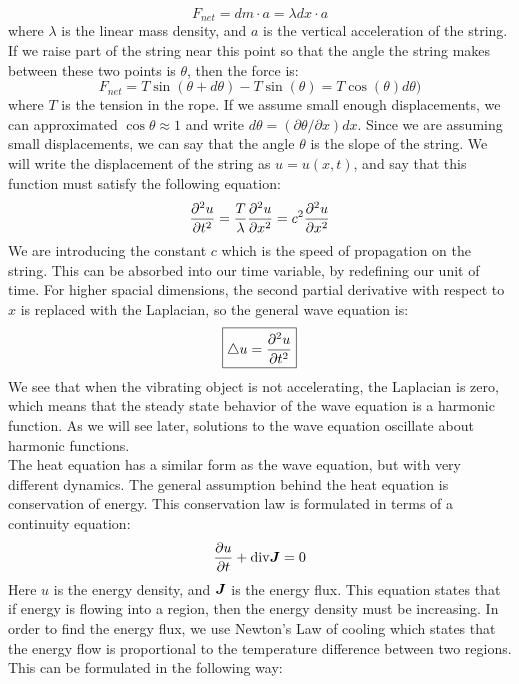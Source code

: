 \documentclass{article}
\begin{document}
\begin{equation}
    F_{net}=dm\cdot a=\lambda dx \cdot a
\end{equation}
where $\lambda$ is the linear mass density, and $a$ is the vertical acceleration of the string. If we raise part of the string near this point so that the angle the string makes between these two points is $\theta$, then the force is:
\begin{equation}
    F_{net}=T \sin(\theta + d\theta)-T \sin(\theta)=T\cos(\theta)d\theta)
\end{equation}
where $T$ is the tension in the rope. If we assume small enough displacements, we can approximated $\cos\theta\approx 1$ and write $d\theta= (\partial\theta/\partial x) dx$. Since we are assuming small displacements, we can say that the angle $\theta$ is the slope of the string. We will write the displacement of the string as $u=u(x,t)$, and say that this function must satisfy the following equation:
\begin{equation}\frac{\partial ^2 u}{\partial t^2}= \frac{T}{\lambda}\frac{\partial ^2 u}{\partial x^2}=c^2 \frac{\partial ^2 u}{\partial x^2}\end{equation}
We are introducing the constant $c$ which is the speed of propagation on the string. This can be absorbed into our time variable, by redefining our unit of time. For higher spacial dimensions, the second partial derivative with respect to $x$ is replaced with the Laplacian, so the general wave equation is:
\begin{equation}
  \boxed{
    \bigtriangleup u =\frac{\partial ^2 u}{\partial t^2}
  }
\end{equation}
We see that when the vibrating object is not accelerating, the Laplacian is zero, which means that the steady state behavior of the wave equation is a harmonic function. As we will see later, solutions to the wave equation oscillate about harmonic functions.\\
The heat equation has a similar form as the wave equation, but with very different dynamics. The general assumption behind the heat equation is conservation of energy. This conservation law is formulated in terms of a continuity equation:
\begin{equation}
  \frac{\partial u}{\partial t}+\mathrm{div} \bm{J}=0
\end{equation}
Here $u$ is the energy density, and $\bm{J}$ is the energy flux. This equation states that if energy is flowing into a region, then the energy density must be increasing. In order to find the energy flux, we use Newton's Law of cooling which states that the energy flow is proportional to the temperature difference between two regions. This can be formulated in the following way:
\end{document}
